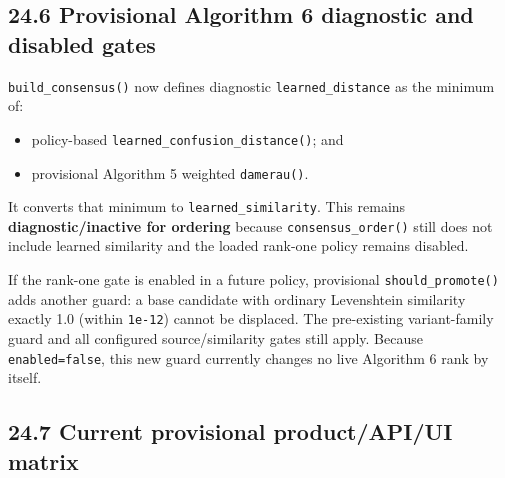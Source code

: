 \subsection{24.6 Provisional Algorithm 6 diagnostic and disabled gates}\label{246-provisional-algorithm-6-diagnostic-and-disabled-gates}

\texttt{build\_\allowbreak{}consensus()} now defines diagnostic \texttt{learned\_\allowbreak{}distance} as the minimum of:

\begin{itemize}
\tightlist
\item
  policy-based \texttt{learned\_\allowbreak{}confusion\_\allowbreak{}distance()}; and
\item
  provisional Algorithm 5 weighted \texttt{damerau()}.
\end{itemize}

It converts that minimum to \texttt{learned\_\allowbreak{}similarity}. This remains \textbf{diagnostic/inactive for ordering} because \texttt{consensus\_\allowbreak{}order()} still does not include learned similarity and the loaded rank-one policy remains disabled.

If the rank-one gate is enabled in a future policy, provisional \texttt{should\_\allowbreak{}promote()} adds another guard: a base candidate with ordinary Levenshtein similarity exactly 1.0 (within \texttt{1e-12}) cannot be displaced. The pre-existing variant-family guard and all configured source/similarity gates still apply. Because \texttt{enabled=false}, this new guard currently changes no live Algorithm 6 rank by itself.

\subsection{24.7 Current provisional product/API/UI matrix}\label{247-current-provisional-productapiui-matrix}

